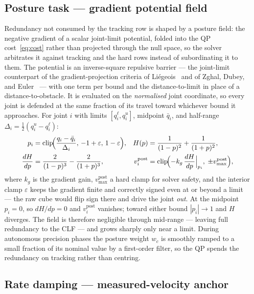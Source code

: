 \subsection{Posture task --- gradient potential field}
\label{sec:posture}

Redundancy not consumed by the tracking row is shaped by a posture field: the negative gradient of a scalar joint-limit potential, folded into the QP cost~\eqref{eq:cost} rather than projected through the null space, so the solver arbitrates it against tracking and the hard rows instead of subordinating it to them. The potential is an inverse-square repulsive barrier --- the joint-limit counterpart of the gradient-projection criteria of Li\'egeois~\cite{liegeois1977} and of Zghal, Dubey, and Euler~\cite{zghal1990} --- with one term per bound and the distance-to-limit in place of a distance-to-obstacle. It is evaluated on the \emph{normalised} joint coordinate, so every joint is defended at the same fraction of its travel toward whichever bound it approaches. For joint $i$ with limits $[q_i^{\ell}, q_i^{u}]$, midpoint $\bar{q}_i$, and half-range $\Delta_i = \tfrac{1}{2}(q_i^{u} - q_i^{\ell})$:
\begin{align}
p_i &= \operatorname{clip}\!\Bigl(\frac{q_i - \bar{q}_i}{\Delta_i},\, -1+\varepsilon,\, 1-\varepsilon\Bigr),
&
H(p) &= \frac{1}{(1-p)^2} + \frac{1}{(1+p)^2},
\\
\frac{dH}{dp} &= \frac{2}{(1-p)^3} - \frac{2}{(1+p)^3},
&
v_i^{\text{post}} &= \operatorname{clip}\!\Bigl(-k_g\,\frac{dH}{dp}\Big|_{p_i},\; \pm v_{\max}^{\text{post}}\Bigr),
\end{align}
where $k_g$ is the gradient gain, $v_{\max}^{\text{post}}$ a hard clamp for solver safety, and the interior clamp $\varepsilon$ keeps the gradient finite and correctly signed even at or beyond a limit --- the raw cube would flip sign there and drive the joint \emph{out}. At the midpoint $p_i = 0$, so $dH/dp = 0$ and $v_i^{\text{post}}$ vanishes; toward either bound $|p_i| \to 1$ and $H$ diverges. The field is therefore negligible through mid-range --- leaving full redundancy to the CLF --- and grows sharply only near a limit. During autonomous precision phases the posture weight $w_c$ is smoothly ramped to a small fraction of its nominal value by a first-order filter, so the QP spends the redundancy on tracking rather than centring.

\subsection{Rate damping --- measured-velocity anchor}
\label{sec:rate}

